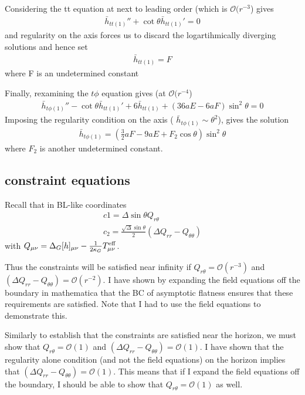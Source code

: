 \documentclass[aps,prd,amsmath,showpacs,amssymb,superscriptaddress,nofootinbib,longbibliography,eqsecnum,preprintnumbers]{revtex4-1}
\begin{document}
Considering the tt equation at next to leading order (which is $\mathcal{O}(r^{-3}$) gives
\begin{align}
\bar h_{tt(1)}''+\cot\theta \bar h_{tt(1)}'=0
\end{align}
and regularity on the axis forces us to discard the logartihmically diverging solutions and hence set
\begin{align}
 \bar h_{tt(1)}=F
\end{align}
where F is an undetermined constant

Finally, rexamining the $t\phi$ equation gives (at $\mathcal{O}(r^{-4}$)
\begin{align}
\bar h_{t\phi(1)}''-\cot\theta \bar h_{tt(1)}' +6\bar h_{tt(1)}+(36aE-6aF)\sin^2\theta=0
\end{align}
Imposing the regularity condition on the axis ( $\bar h_{t\phi(1)}\sim \theta^2$), gives the solution
\begin{align}
 \bar h_{t\phi(1)}=\left( \frac{3}{2}aF-9aE+F_2 \cos\theta \right)\sin^2\theta
\end{align}
where $F_2$ is another undetermined constant.

\subsection{constraint equations}
Recall that in BL-like coordinates
\begin{align}
c1= \Delta \sin\theta Q_{r\theta} \nonumber \\
c_2=\frac{\sqrt{\Delta}\sin\theta}{2}(\Delta Q_{rr}-Q_{\theta\theta})
\end{align}
with $Q_{\mu\nu}=\Delta_G[h]_{\mu\nu}-\frac{1}{2\kappa_G}T_{\mu\nu}^{\rm eff}$. 

Thus the constraints will be satisfied near infinity if $Q_{r\theta} =\mathcal{O}(r^{-3})$ and $(\Delta Q_{rr}-Q_{\theta\theta})=\mathcal{O}(r^{-2})$. I have shown by expanding the field equations off the boundary in mathematica that the BC of asymptotic flatness ensures that these requirements are satisfied. Note that I had to use the field equations to demonstrate this.

Similarly to establish that the constraints are satisfied near the horizon, we must show that $Q_{r\theta} =\mathcal{O}(1)$ and $(\Delta Q_{rr}-Q_{\theta\theta})=\mathcal{O}(1)$. I have shown that the regularity alone condition (and not the field equations) on the horizon implies that $(\Delta Q_{rr}-Q_{\theta\theta})=\mathcal{O}(1)$. This means that if I expand the field equations off the boundary, I should be able to show that $Q_{r\theta} =\mathcal{O}(1)$ as well.
\end{document}
